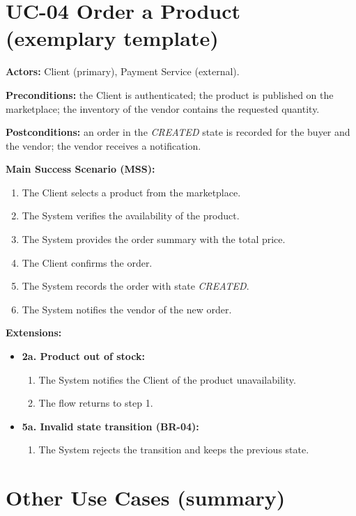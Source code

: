 \section{UC-04 Order a Product (exemplary template)}
\label{sec:uc04}

\textbf{Actors:} Client (primary), Payment Service (external).

\textbf{Preconditions:} the Client is authenticated; the product is published
on the marketplace; the inventory of the vendor contains the requested
quantity.

\textbf{Postconditions:} an order in the \emph{CREATED} state is recorded for
the buyer and the vendor; the vendor receives a notification.

\textbf{Main Success Scenario (MSS):}
\begin{enumerate}
    \item The Client selects a product from the marketplace.
    \item The System verifies the availability of the product.
    \item The System provides the order summary with the total price.
    \item The Client confirms the order.
    \item The System records the order with state \emph{CREATED}.
    \item The System notifies the vendor of the new order.
\end{enumerate}

\textbf{Extensions:}
\begin{itemize}
    \item \textbf{2a. Product out of stock:}
    \begin{enumerate}
        \item The System notifies the Client of the product unavailability.
        \item The flow returns to step 1.
    \end{enumerate}
    \item \textbf{5a. Invalid state transition (BR-04):}
    \begin{enumerate}
        \item The System rejects the transition and keeps the previous state.
    \end{enumerate}
\end{itemize}

\section{Other Use Cases (summary)}

